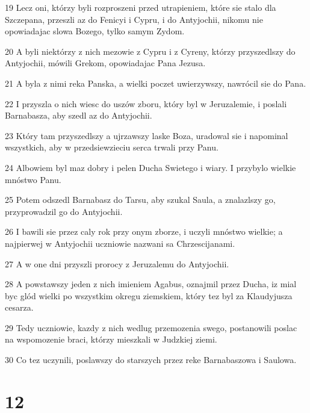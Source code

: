 \par 19 Lecz oni, którzy byli rozproszeni przed utrapieniem, które sie stalo dla Szczepana, przeszli az do Fenicyi i Cypru, i do Antyjochii, nikomu nie opowiadajac slowa Bozego, tylko samym Zydom.
\par 20 A byli niektórzy z nich mezowie z Cypru i z Cyreny, którzy przyszedlszy do Antyjochii, mówili Grekom, opowiadajac Pana Jezusa.
\par 21 A byla z nimi reka Panska, a wielki poczet uwierzywszy, nawrócil sie do Pana.
\par 22 I przyszla o nich wiesc do uszów zboru, który byl w Jeruzalemie, i poslali Barnabasza, aby szedl az do Antyjochii.
\par 23 Który tam przyszedlszy a ujrzawszy laske Boza, uradowal sie i napominal wszystkich, aby w przedsiewzieciu serca trwali przy Panu.
\par 24 Albowiem byl maz dobry i pelen Ducha Swietego i wiary. I przybylo wielkie mnóstwo Panu.
\par 25 Potem odszedl Barnabasz do Tarsu, aby szukal Saula, a znalazlszy go, przyprowadzil go do Antyjochii.
\par 26 I bawili sie przez caly rok przy onym zborze, i uczyli mnóstwo wielkie; a najpierwej w Antyjochii uczniowie nazwani sa Chrzescijanami.
\par 27 A w one dni przyszli prorocy z Jeruzalemu do Antyjochii.
\par 28 A powstawszy jeden z nich imieniem Agabus, oznajmil przez Ducha, iz mial byc glód wielki po wszystkim okregu ziemskiem, który tez byl za Klaudyjusza cesarza.
\par 29 Tedy uczniowie, kazdy z nich wedlug przemozenia swego, postanowili poslac na wspomozenie braci, którzy mieszkali w Judzkiej ziemi.
\par 30 Co tez uczynili, poslawszy do starszych przez reke Barnabaszowa i Saulowa.

\chapter{12}

